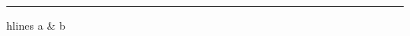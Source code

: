 \documentclass{article}
\begin{document}
\noindent\rule{\linewidth}{0.4pt}

\begin{tblr}{hlines}
    a & b \\
\end{tblr}
\end{document}
